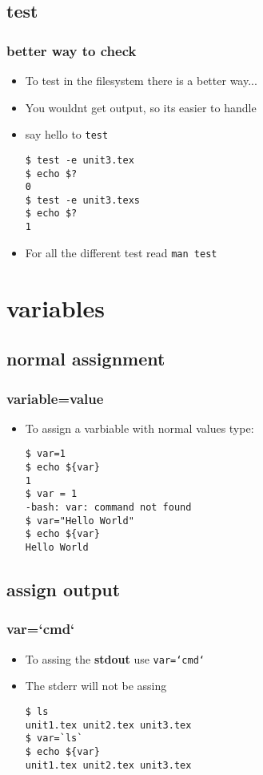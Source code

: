 \documentclass[hyperref={pdfpagelabels=false}]{beamer}
\newcommand{\code}[1]{\colorbox{lGray}{\texttt{#1}}}
\begin{document}
    \subsection{test}
		\begin{frame}[fragile]
            \frametitle{better way to check}
			\begin{itemize}
                \item<1-> To test in the filesystem there is a better way...
                \item<2-> You wouldnt get output, so its easier to handle
                \item<3-> say hello to \code{test}
                    \begin{verbatim}
$ test -e unit3.tex 
$ echo $?
0
$ test -e unit3.texs 
$ echo $?
1
\end{verbatim}
                \item<4-> For all the different test read \code{man test}
            \end{itemize}
		\end{frame}
\section{variables}
    \subsection{normal assignment}
		\begin{frame}[fragile]
            \frametitle{variable=value}
			\begin{itemize}
                \item<1-> To assign a varbiable with normal values type:
                    \begin{verbatim}
$ var=1
$ echo ${var}
1
$ var = 1
-bash: var: command not found
$ var="Hello World"
$ echo ${var}
Hello World
\end{verbatim}
            \end{itemize}
		\end{frame}

    \subsection{assign output}
		\begin{frame}[fragile]
            \frametitle{var=`cmd`}
			\begin{itemize}
                \item<1-> To assing the \textbf{stdout} use \code{var=`cmd`}
                \item<2-> The stderr will not be assing
                    \begin{verbatim}
$ ls
unit1.tex unit2.tex unit3.tex
$ var=`ls`
$ echo ${var}
unit1.tex unit2.tex unit3.tex
\end{verbatim}
            \end{itemize}
		\end{frame}
\end{document}
